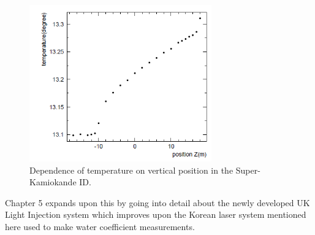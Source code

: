 \begin{figure}
    \centering
    \includegraphics[width=0.7\textwidth]{Figures/temperature_grad.png}
    \caption{Dependence of temperature on vertical position in the Super-Kamiokande ID.}
    \label{fig:temperature_grad}
\end{figure}

Chapter 5 expands upon this by going into detail about the newly developed UK Light Injection system which improves upon the Korean laser system mentioned here used to make water coefficient measurements. 






